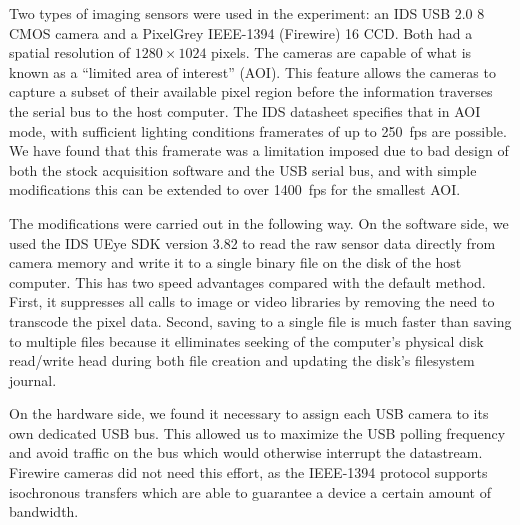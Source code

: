 Two types of imaging sensors were used in the experiment: an IDS USB 2.0
\SI{8}{\bit} CMOS camera and a PixelGrey IEEE-1394 (Firewire) \SI{16}{\bit}
CCD.  Both had a spatial resolution of $1280\times1024$ pixels.  The
cameras are capable of what is known as a ``limited area of interest''
(AOI).  This feature allows the cameras to capture a subset of their
available pixel region before the information traverses the serial bus to
the host computer.  The IDS datasheet specifies that in AOI mode, with
sufficient lighting conditions framerates of up to \SI{250}{fps} are
possible.  We have found that this framerate was a limitation imposed due
to bad design of both the stock acquisition software and the USB serial
bus, and with simple modifications this can be extended to over
\SI{1400}{fps} for the smallest AOI.

The modifications were carried out in the following way.  On the software
side, we used the IDS UEye SDK version 3.82 to read the raw sensor data
directly from camera memory and write it to a single binary file on the
disk of the host computer.  This has two speed advantages compared with the
default method.  First, it suppresses all calls to image or video libraries
by removing the need to transcode the pixel data.  Second, saving to a
single file is much faster than saving to multiple files because it
elliminates seeking of the computer's physical disk read/write head during
both file creation and updating the disk's filesystem journal.  

On the hardware side, we found it necessary to assign each USB camera to
its own dedicated USB bus.  This allowed us to maximize the USB polling
frequency and avoid traffic on the bus which would otherwise interrupt the
datastream.  Firewire cameras did not need this effort, as the IEEE-1394
protocol supports isochronous transfers which are able to guarantee a
device a certain amount of bandwidth.

